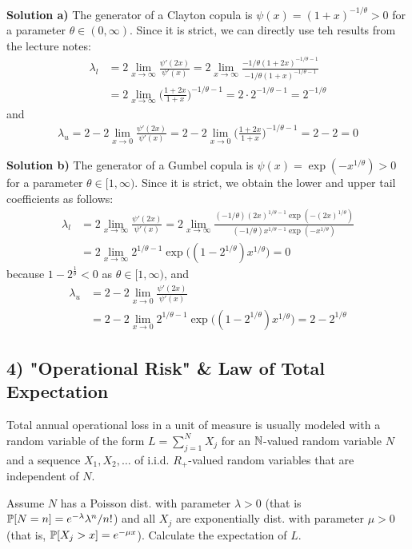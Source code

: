 \textbf{Solution a)} The generator of a Clayton copula is $\psi(x) = (1+x)^{-1/\theta} > 0$ for a parameter $\theta \in (0, \infty)$. Since it is strict, we can directly use teh results from the lecture notes:
\begin{align*}
    \lambda_l &= 2 \lim_{x\to\infty} \frac{\psi'(2x)}{\psi'(x)} = 2\lim_{x\to\infty}
    \frac{-1/\theta(1+2x)^{-1/\theta-1}}{-1/\theta(1+x)^{-1/\theta-1}} \\
    &= 2 \lim_{x\to\infty}\bigg(\frac{1+2x}{1+x}\bigg)^{-1/\theta-1} = 2\cdot 2^{-1/\theta-1} = 2^{-1/\theta}
\end{align*}
and
\begin{align*}
    \lambda_u = 2 - 2\lim_{x\to 0}\frac{\psi'(2x)}{\psi'(x)} 
    = 2 - 2\lim_{x\to 0}\bigg(\frac{1+2x}{1+x}\bigg)^{-1/\theta -1} = 2 - 2 = 0
\end{align*}

\textbf{Solution b)} The generator of a Gumbel copula is $\psi(x) = \exp(-x^{1/\theta}) > 0$ for a parameter $\theta\in[1,\infty)$. Since it is strict, we obtain the lower and upper tail coefficients as follows:
\begin{align*}
    \lambda_l &= 2\lim_{x\to\infty}\frac{\psi'(2x)}{\psi'(x)} = 2\lim_{x\to\infty}
    \frac{(-1/\theta)(2x)^{1/\theta -1} \exp(-(2x)^{1/\theta})}{(-1/\theta)x^{1/\theta-1}\exp(-x^{1/\theta})} \\
    &= 2\lim_{x\to\infty} 2^{1/\theta-1}\exp\bigg((1-2^{1/\theta})x^{1/\theta}\bigg) = 0
\end{align*}
because $1-2^\frac{1}{\theta} < 0$ as $\theta \in [1, \infty)$, and
\begin{align*}
    \lambda_u &= 2 - 2\lim_{x\to 0}\frac{\psi'(2x)}{\psi'(x)} \\
    &= 2 - 2\lim_{x\to 0}2^{1/\theta -1}\exp\bigg((1-2^{1/\theta})x^{1/\theta}\bigg) = 2 - 2^{1/\theta}
\end{align*}

%
%
\subsection*{4) "Operational Risk" \& Law of Total Expectation}
Total annual operational loss in a unit of measure is usually modeled with a random variable of the form $L = \sum_{j=1}^N X_j$ for an $\mathbb{N}$-valued random variable $N$ and a sequence $X_1, X_2, \dots$ of i.i.d. $R_+$-valued random variables that are independent of $N$.

Assume $N$ has a Poisson dist. with parameter $\lambda > 0$ (that is $\mathbb{P}[N=n] = e^{-\lambda}\lambda^n/n!$) and all $X_j$ are exponentially dist. with parameter $\mu > 0$ (that is, $\mathbb{P}[X_j > x] = e^{-\mu x}$). Calculate the expectation of $L$.

